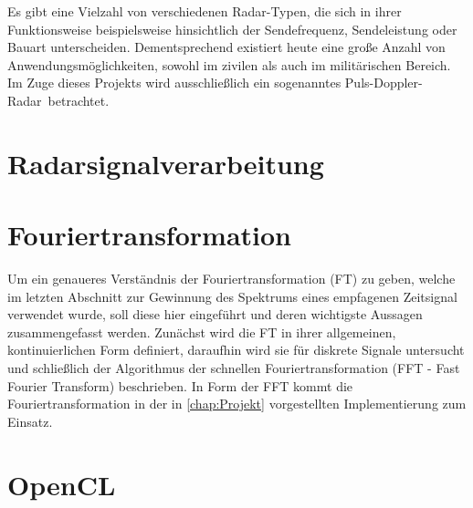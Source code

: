 \documentclass[a4paper,12pt,oneside,german,toc=bibliography]{scrbook}
\theoremstyle{definition}
\theoremstyle{plain}
\numberwithin{equation}{section}
\begin{document}
Es gibt eine Vielzahl von verschiedenen Radar-Typen, die sich in ihrer Funktionsweise beispielsweise hinsichtlich der Sendefrequenz, Sendeleistung  oder Bauart unterscheiden. Dementsprechend existiert heute eine große Anzahl von Anwendungsmöglichkeiten, sowohl im zivilen als auch im militärischen Bereich. Im Zuge dieses Projekts wird ausschließlich ein sogenanntes \glqq Puls-Doppler-Radar\grqq ~betrachtet. 









\section{Radarsignalverarbeitung}







\section{Fouriertransformation}
Um ein genaueres Verständnis der Fouriertransformation (FT) zu geben, welche im letzten Abschnitt zur Gewinnung des Spektrums eines empfagenen Zeitsignal verwendet wurde, soll diese hier eingeführt und deren wichtigste Aussagen zusammengefasst werden. Zunächst wird die FT in ihrer allgemeinen, kontinuierlichen Form definiert, daraufhin wird sie für diskrete Signale untersucht und schließlich der Algorithmus der schnellen Fouriertransformation (FFT - Fast Fourier Transform) beschrieben. In Form der FFT kommt die Fouriertransformation in der in \cref{chap:Projekt} vorgestellten Implementierung zum Einsatz.






\section{OpenCL}
\end{document}
